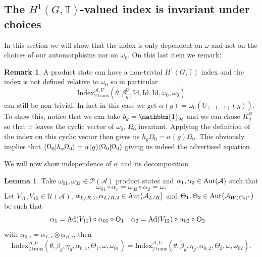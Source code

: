 \documentclass[12pt,a4paper,twoside]{article}
\let\originalleft\left
\let\originalright\right
\renewcommand{\left}{\mathopen{}\mathclose\bgroup\originalleft}
\renewcommand{\right}{\aftergroup\egroup\originalright}
\newcommand{\UU}{\mathcal U}
\newcommand{\PP}{\mathcal P}
\newcommand{\HH}{\mathcal H}
\newcommand{\TT}{\mathbb T}
\renewcommand{\AA}{\mathcal A}
\newcommand{\id}{\mathbbm{1}}
\newcommand{\Ad}[1]{\textrm{Ad}\left(#1\right)}
\newcommand{\Aut}[1]{\textrm{Aut}\left(#1\right)}
\theoremstyle{definition}
\newtheorem{lemma}[theorem]{Lemma}
\newtheorem{remark}[theorem]{Remark}
\numberwithin{equation}{section}
\begin{document}
\subsection{The $H^1(G,\TT)$-valued index is invariant under choices}
In this section we will show that the index is only dependent on $\omega$ and not on the choices of our automorphisms nor on $\omega_0$. On this last item we remark:
\begin{remark}\label{rem:NontrivialProductState}
	A product state can have a non-trivial $H^1(G,\TT)$ index and the index is not defined relative to $\omega_0$ so in particular
	\begin{equation}
		\textrm{Index}_{2\:\text{trans}}^{\AA,U}(\theta,\beta_g^U,\textrm{Id},\textrm{Id},\textrm{Id},\omega_0,\omega_0)
	\end{equation}
	can still be non-trivial. In fact in this case we get $\alpha(g)=\omega_0(U_{(-1,-1)}(g))$. To show this, notice that we can take $b_g=\id_{\HH}$ and we can chose $K_g^R$ so that it leaves the cyclic vector of $\omega_0$, $\Omega_0$ invariant. Applying the definition of the index on this cyclic vector then gives us $h_g\Omega_0=\alpha(g)\Omega_0$. This obviously implies that $\bra{\Omega_0}\ket{h_g\Omega_0}=\alpha(g)\bra{\Omega_0}\ket{\Omega_0}$ giving us indeed the advertised equation.
\end{remark}
We will now show independence of $\alpha$ and its decomposition.
\begin{lemma}
	Take $\omega_{01},\omega_{02}\in\PP(\AA)$ product states and $\alpha_1,\alpha_2\in\Aut{\AA}$ such that
	\begin{equation}
		\omega_{01}\circ\alpha_1=\omega_{02}\circ\alpha_2=\omega.
	\end{equation}
	Let $V_{11},V_{12}\in\UU(\AA)$, $\alpha_{L/R,1},\alpha_{L/R,2}\in\Aut{\AA_{L/R}}$ and $\Theta_1,\Theta_2\in \Aut{\AA_{W(C_\theta)^c}}$ be such that
	\begin{align}
		\alpha_1&=\Ad{V_{11}}\circ\alpha_{01}\circ\Theta_1&\alpha_2&=\Ad{V_{12}}\circ\alpha_{02}\circ \Theta_2
	\end{align}
	with $\alpha_{0,i}=\alpha_{L,i}\otimes\alpha_{R,i}$, then
	\begin{equation}
		\textrm{Index}_{2\:\text{trans}}^{\AA,U}(\theta,\tilde{\beta}_g,\eta_g,\alpha_{0,1},\Theta_1,\omega,\omega_{01})=\textrm{Index}_{2\:\text{trans}}^{\AA,U}(\theta,\tilde{\beta}_g,\eta_g,\alpha_{0,2},\Theta_2,\omega,\omega_{02}).
	\end{equation}
\end{lemma}
\end{document}
